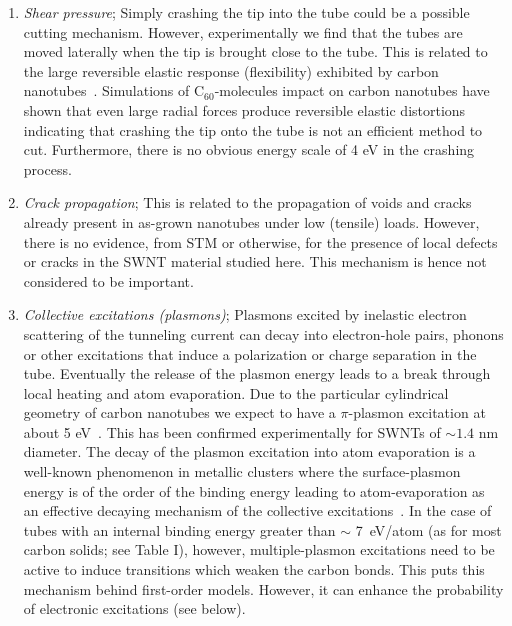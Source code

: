 \begin{multicols}{2}
\begin{enumerate}
\item{\it Shear pressure};
Simply crashing the tip into the tube could be a possible cutting
mechanism. However, experimentally we find that the tubes are
moved laterally when the tip is brought close to the tube. This is
related to the large reversible elastic response (flexibility)
exhibited by carbon nanotubes~\cite{falvo98}. Simulations of
C$_{60}$-molecules impact on carbon nanotubes have shown that even
large radial forces produce reversible elastic distortions
indicating that crashing the tip onto the tube is not an efficient
method to cut\cite{ar1}. Furthermore, there is no obvious energy
scale of 4 eV in the crashing process.

\item{\it Crack propagation}; This is related to the propagation of
voids and cracks already present in as-grown nanotubes under low
(tensile) loads. However, there is no evidence, from STM or
otherwise, for the presence of local defects or cracks in the SWNT
material studied here. This mechanism is hence not considered to
be important.

\item{\it Collective excitations (plasmons)};
Plasmons excited by inelastic electron scattering of the tunneling
current can decay into electron-hole pairs, phonons or other excitations
that induce a polarization or charge separation in the tube.
Eventually the release of the plasmon energy leads to a break
through local heating and atom evaporation. Due to the particular
cylindrical geometry of carbon nanotubes we expect to have a $\pi
$-plasmon excitation at about 5 eV~\cite{plasmon}. This has been
confirmed experimentally \cite{Pichler} for SWNTs of $\sim 1.4$ nm
diameter. The decay of the plasmon excitation into atom
evaporation is a well-known phenomenon in metallic clusters where
the surface-plasmon energy is of the order of the binding energy
leading to atom-evaporation as an effective decaying mechanism of
the collective excitations~\cite{Heer}. In the case of tubes with
an internal binding energy greater than $\sim$ 7~eV/atom (as for
most carbon solids; see Table I), however, multiple-plasmon
excitations need to be active to induce transitions which weaken
the carbon bonds. This puts this mechanism behind first-order
models. However, it can enhance the probability of electronic
excitations (see below).


\end{enumerate}
\end{multicols}
